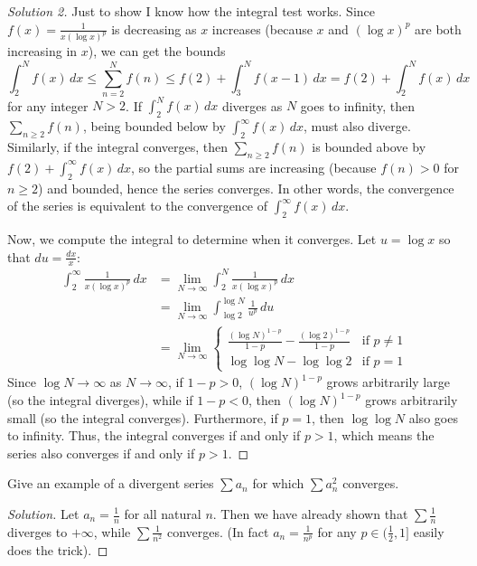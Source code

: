 \documentclass[11pt]{scrartcl}
\providecommand{\half}{\frac{1}{2}}
\theoremstyle{problem}
\newenvironment{problem}[1]
{\renewcommand\theinnercustomthm{#1}\innercustomthm}
{\endinnercustomthm}
\theoremstyle{remark}
\newenvironment{soln}{\begin{proof}[Solution]}{\end{proof}}
\begin{document}
\begin{proof}[Solution 2]
	Just to show I know how the integral test works.
	Since $f(x) = \frac{1}{x(\log x)^p}$ is decreasing as $x$ increases
	(because $x$ and $(\log x)^p$ are both increasing in $x$),
	we can get the bounds
	\[\int_{2}^N f(x)\,dx \le
	\sum_{n=2}^N f(n) \le f(2) + \int_{3}^N f(x-1)\,dx
	= f(2) + \int_2^N f(x)\,dx\]
	for any integer $N > 2$.
	If $\int_2^N f(x)\,dx$ diverges as $N$ goes to infinity,
	then $\sum_{n\ge 2} f(n)$, being bounded below by $\int_2^\infty f(x)\,dx$,
	must also diverge.
	Similarly, if the integral converges, then
	$\sum_{n\ge 2} f(n)$ is bounded above by $f(2) + \int_2^\infty f(x)\,dx$,
	so the partial sums are increasing (because $f(n) > 0$ for $n \ge 2$)
	and bounded, hence the series converges.
	In other words, the convergence of the series
	is equivalent to the convergence of $\int_2^\infty f(x)\,dx$.
	
	Now, we compute the integral to determine when it converges.
	Let $u = \log x$ so that $du = \frac{dx}x$:
	\begin{align*}
		\int_2^\infty \frac{1}{x(\log x)^p}\,dx &=
		\lim_{N\to\infty}\int_2^N \frac{1}{x(\log x)^p}\,dx\\
		&= \lim_{N\to\infty}\int_{\log 2}^{\log N} \frac{1}{u^p}\,du\\
		&= \lim_{N\to\infty} \begin{cases}
			\frac{(\log N)^{1 - p}}{1 - p} - \frac{(\log 2)^{1 - p}}{1 - p}
			& \text{if } p \ne 1\\
			\log \log N - \log \log 2 & \text{if } p = 1
		\end{cases}
	\end{align*}
	Since $\log N\to\infty$ as $N\to\infty$,
	if $1 - p > 0$, $(\log N)^{1-p}$ grows arbitrarily large
	(so the integral diverges),
	while if $1 - p < 0$, then $(\log N)^{1-p}$ grows arbitrarily small
	(so the integral converges).
	Furthermore, if $p = 1$, then $\log\log N$ also goes to infinity.
	Thus, the integral converges if and only if $p > 1$,
	which means the series also converges if and only if $p > 1$.
\end{proof}


\begin{problem}{15.6a}
	Give an example of a divergent series $\sum a_n$
	for which $\sum a_n^2$ converges.
\end{problem}

\begin{soln}
	Let $a_n = \frac 1n$ for all natural $n$.
	Then we have already shown that $\sum \frac 1n$ diverges to $+\infty$,
	while $\sum \frac 1{n^2}$ converges.
	(In fact $a_n = \frac{1}{n^p}$ for any $p\in(\half, 1]$
	easily does the trick).
\end{soln}
\end{document}
